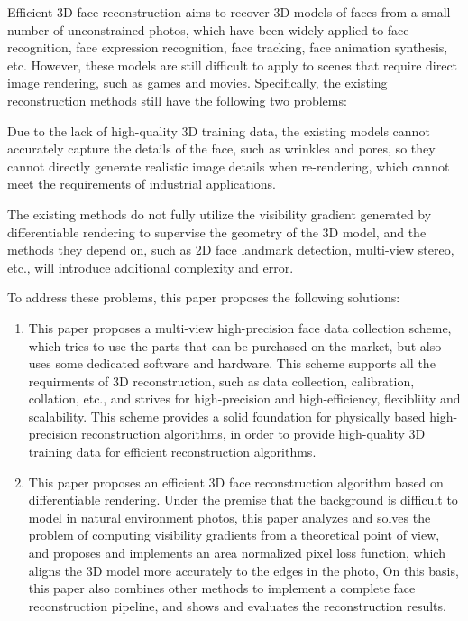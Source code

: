 \documentclass{scutmaster}
\begin{document}
Efficient 3D face reconstruction aims to recover 3D models of faces from a small number of unconstrained photos,
which have been widely applied to face recognition, face expression recognition, face tracking, face animation synthesis, etc.
However, these models are still difficult to apply to scenes that require direct image rendering, such as games and movies.
Specifically, the existing reconstruction methods still have the following two problems:
\begin{enumerate*}
\item Due to the lack of high-quality 3D training data, the existing models cannot accurately capture the details of the face,
such as wrinkles and pores,
so they cannot directly generate realistic image details when re-rendering, which cannot meet the requirements of industrial applications.
\item The existing methods do not fully utilize the visibility gradient generated by differentiable rendering to supervise the geometry of the 3D model,
and the methods they depend on, such as 2D face landmark detection, multi-view stereo, etc., will introduce additional complexity and error.
\end{enumerate*}

To address these problems, this paper proposes the following solutions:
\begin{enumerate}
\item This paper proposes a multi-view high-precision face data collection scheme,
which tries to use the parts that can be purchased on the market,
but also uses some dedicated software and hardware.
This scheme supports all the requirments of 3D reconstruction, such as data collection, calibration, collation, etc.,
and strives for high-precision and high-efficiency, flexibliity and scalability.
This scheme provides a solid foundation for physically based high-precision reconstruction algorithms,
in order to provide high-quality 3D training data for efficient reconstruction algorithms.
\item This paper proposes an efficient 3D face reconstruction algorithm based on differentiable rendering.
Under the premise that the background is difficult to model in natural environment photos, this paper analyzes and solves the problem of computing visibility gradients from a theoretical point of view,
and proposes and implements an area normalized pixel loss function,
which aligns the 3D model more accurately to the edges in the photo,
On this basis, this paper also combines other methods to implement a complete face reconstruction pipeline,
and shows and evaluates the reconstruction results.
\end{enumerate}
\end{document}
